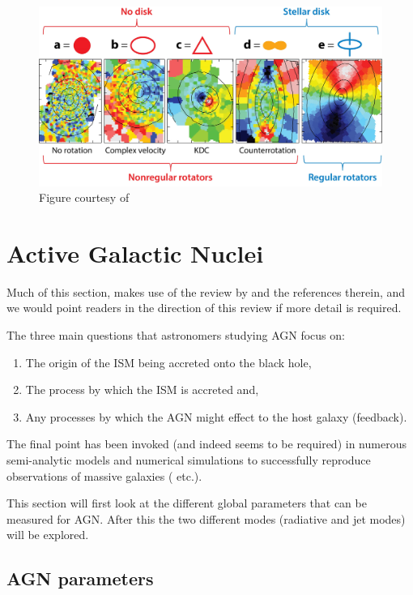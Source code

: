 {{	\begin{figure}
		\centering
		\includegraphics[width=\textwidth]{introduction/substructure.jpeg}
		\caption[Examples of the kinematic substructure classifications]{Figure courtesy of \citet{Cappellari2016}}
		\label{fig:introEgSubstructure}
	\end{figure}



\section{Active Galactic Nuclei}
	\label{sec:introAGN}
	Much of this section, makes use of the review by \citet{Heckman2014} and the references therein, and we would point readers in the direction of this review if more detail is required. 

	The three main questions that astronomers studying AGN focus on:
	\begin{enumerate}
		\item The origin of the ISM being accreted onto the black hole,
		\item The process by which the ISM is accreted and,
		\item Any processes by which the AGN might effect to the host galaxy (feedback).
	\end{enumerate}
	The final point has been invoked (and indeed seems to be required) in numerous semi-analytic models and numerical simulations to successfully reproduce observations of massive galaxies (\citet{DiMatteo2005, Bower2006, Springel2005} etc.). 

	This section will first look at the different global parameters that can be measured for AGN. After this the two different modes (radiative and jet modes) will be explored.

	\subsection{AGN parameters}
		\label{subsec:introAGNparams}

}}
